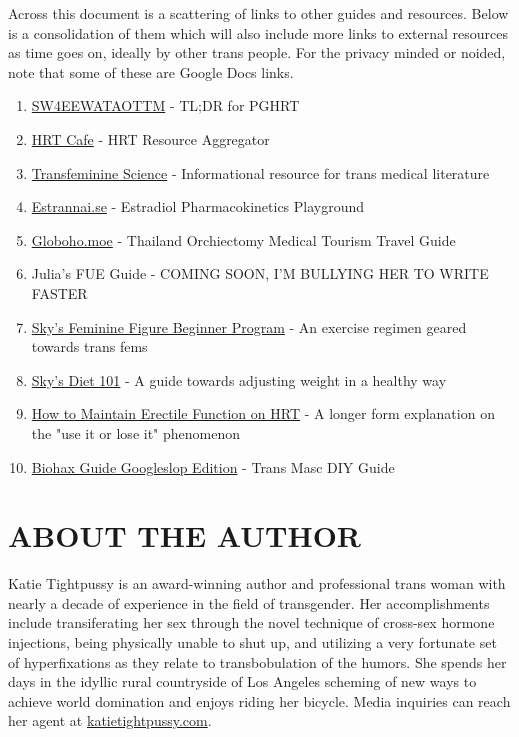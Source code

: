 \documentclass{article}
\begin{document}
{{Across this document is a scattering of links to other guides and resources. Below is a consolidation of them which will also include more links to external resources as time goes on, ideally by other trans people. For the privacy minded or noided, note that some of these are Google Docs links.

\begin{enumerate}
  \item \href{https://startwith4mgestradiolenanthateweeklyandtestatonetothreemonths.com/}{SW4EEWATAOTTM} - TL;DR for PGHRT
  \item \href{https://hrtcafe.net/}{HRT Cafe} - HRT Resource Aggregator
  \item \href{https://transfemscience.org/}{Transfeminine Science} - Informational resource for trans medical literature
  \item \href{http://estrannai.se}{Estrannai.se} - Estradiol Pharmacokinetics Playground
  \item \href{https://globoho.moe/}{Globoho.moe} - Thailand Orchiectomy Medical Tourism Travel Guide 
  \item Julia's FUE Guide - COMING SOON, I'M BULLYING HER TO WRITE FASTER
  \item \href{https://docs.google.com/document/d/1-NyE5EY5TTaRRMhk7HlTbKJ7HifjEsA4jlDO1qKQVl0/edit?tab=t.0}{Sky's Feminine Figure Beginner Program} - An exercise regimen geared towards trans fems
  \item \href{https://docs.google.com/document/d/114sztSw1aVWM2pXLDl9NrHklyvewz3EmFiHiisjM71k/edit?tab=t.0}{Sky's Diet 101} - A guide towards adjusting weight in a healthy way
  \item \href{https://stainedglasswoman.substack.com/p/how-to-maintain-your-penis-function}{How to Maintain Erectile Function on HRT} - A longer form explanation on the "use it or lose it" phenomenon
  \item \href{hhttps://docs.google.com/document/d/1DXFxzN0XTudPZez_SO61fpqncRLPH_Be_QG_8Pcz9LU/edit?pli=1&tab=t.0}{Biohax Guide Googleslop Edition} - Trans Masc DIY Guide
\end{enumerate}

\section*{ABOUT THE AUTHOR}

Katie Tightpussy is an award-winning author and professional trans woman with nearly a decade of experience in the field of transgender. Her accomplishments include transiferating her sex through the novel technique of cross-sex hormone injections, being physically unable to shut up, and utilizing a very fortunate set of hyperfixations as they relate to transbobulation of the humors. She spends her days in the idyllic rural countryside of Los Angeles scheming of new ways to achieve world domination and enjoys riding her bicycle. Media inquiries can reach her agent at \href{http://katietightpussy.com}{katietightpussy.com}.

}}
\end{document}
